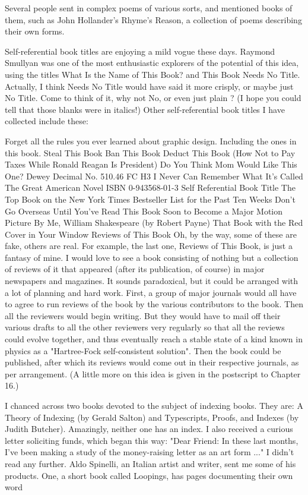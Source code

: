 Several people sent in complex poems of various sorts, and mentioned books of them, such as John Hollander's Rhyme's Reason, a collection of poems describing their own forms. 
\separator

Self-referential book titles are enjoying a mild vogue these days. Raymond Smullyan was one of the most enthusiastic explorers of the potential of this idea, using the titles What Is the Name of This Book? and This Book Needs No Title. Actually, I think Needs No Title would have said it more crisply, or maybe just No Title. Come to think of it, why not No, or even just plain ? (I hope you could tell that those blanks were in italics!) Other self-referential book titles I have collected include these: 



Forget all the rules you ever learned about graphic design. Including the ones in this book. Steal This Book Ban This Book Deduct This Book (How Not to Pay Taxes While Ronald Reagan Is President) Do You Think Mom Would Like This One? Dewey Decimal No. 510.46 FC H3 I Never Can Remember What It's Called The Great American Novel ISBN 0-943568-01-3 Self Referential Book Title The Top Book on the New York Times Bestseller List for the Past Ten Weeks Don't Go Overseas Until You've Read This Book Soon to Become a Major Motion Picture By Me, William Shakespeare (by Robert Payne) That Book with the Red Cover in Your Window Reviews of This Book 
Oh, by the way, some of these are fake, others are real. For example, the last one, Reviews of This Book, is just a fantasy of mine. I would love to see a book consisting of nothing but a collection of reviews of it that appeared (after its publication, of course) in major newspapers and magazines. It sounds paradoxical, but it could be arranged with a lot of planning and hard work. First, a group of major journals would all have to agree to run reviews of the book by the various contributors to the book. Then all the reviewers would begin writing. But they would have to mail off their various drafts to all the other reviewers very regularly so that all the reviews could evolve together, and thus eventually reach a stable state of a kind known in physics as a "Hartree-Fock self-consistent solution". Then the book could be published, after which its reviews would come out in their respective journals, as per arrangement. (A little more on this idea is given in the postscript to Chapter 16.) 
\separator

I chanced across two books devoted to the subject of indexing books. They are: A Theory of Indexing (by Gerald Salton) and Typescripts, Proofs, and Indexes (by Judith Butcher). Amazingly, neither one has an index. I also received a curious letter soliciting funds, which began this way: "Dear Friend: In these last months, I've been making a study of the money-raising letter as an art form ..." I didn't read any further. Aldo Spinelli, an Italian artist and writer, sent me some of his products. One, a short book called Loopings, has pages documenting their own word 



